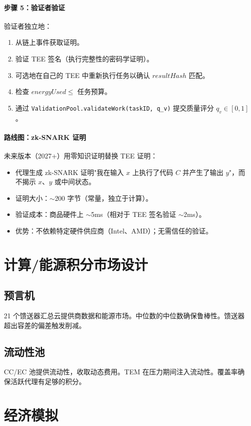 \documentclass[11pt]{article}
\begin{document}
\paragraph{步骤 5：验证者验证}
验证者独立地：
\begin{enumerate}[noitemsep]
  \item 从链上事件获取证明。
  \item 验证 TEE 签名（执行完整性的密码学证明）。
  \item 可选地在自己的 TEE 中重新执行任务以确认 $resultHash$ 匹配。
  \item 检查 $energyUsed \leq$ 任务预算。
  \item 通过 \texttt{ValidationPool.validateWork(taskID, q\_v)} 提交质量评分 $q_v \in [0,1]$。
\end{enumerate}

\paragraph{路线图：zk-SNARK 证明}
未来版本（2027+）用零知识证明替换 TEE 证明：
\begin{itemize}[noitemsep]
  \item 代理生成 zk-SNARK 证明"我在输入 $x$ 上执行了代码 $C$ 并产生了输出 $y$"，而不揭示 $x$、$y$ 或中间状态。
  \item 证明大小：$\sim$200 字节（常量，独立于计算）。
  \item 验证成本：商品硬件上 $\sim$5ms（相对于 TEE 签名验证 $\sim$2ms）。
  \item 优势：不依赖特定硬件供应商（Intel、AMD）；无需信任的验证。
\end{itemize}

\section{计算/能源积分市场设计}
\subsection{预言机}
21 个馈送器汇总云提供商数据和能源市场。中位数的中位数确保鲁棒性。馈送器超出容差的偏差触发削减。

\subsection{流动性池}
CC/EC 池提供流动性，收取动态费用。TEM 在压力期间注入流动性。覆盖率确保活跃代理有足够的积分。

\section{经济模拟}
\label{sec:econ-sim}
\end{document}
